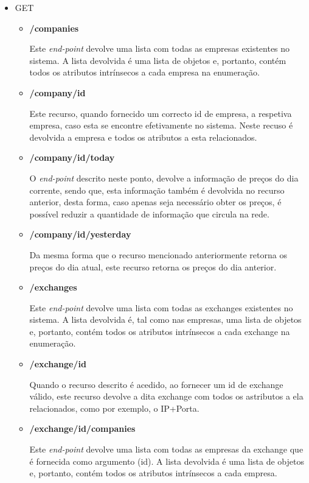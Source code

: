 \documentclass[a4paper,12pt]{article}
\begin{document}
\begin{itemize}
\item GET
  \begin{itemize}
    \item \textbf{/companies}
    \par Este \textit{end-point} devolve uma lista com todas as empresas existentes no sistema. A lista devolvida é uma lista de objetos e, portanto, contém todos os atributos intrínsecos a cada empresa na enumeração.
    
    \item \textbf{/company/{id}}
    \par Este recurso, quando fornecido um correcto id de empresa, a respetiva empresa, caso esta se encontre efetivamente no sistema. Neste recuso é devolvida a empresa e todos os atributos a esta relacionados.
    
    \item \textbf{/company/{id}/today}
    \par O \textit{end-point} descrito neste ponto, devolve a informação de preços do dia corrente, sendo que, esta informação também é devolvida no recurso anterior, desta forma, caso apenas seja necessário obter os preços, é possível reduzir a quantidade de informação que circula na rede.
    
    \item \textbf{/company/{id}/yesterday}
    \par Da mesma forma que o recurso mencionado anteriormente retorna os preços do dia atual, este recurso retorna os preços do dia anterior.
    
    \item \textbf{/exchanges}
    \par Este \textit{end-point} devolve uma lista com todas as exchanges existentes no sistema. A lista devolvida é, tal como nas empresas, uma lista de objetos e, portanto, contém todos os atributos intrínsecos a cada exchange na enumeração.

    \item \textbf{/exchange/{id}}
    \par Quando o recurso descrito é acedido, ao fornecer um id de exchange válido, este recurso devolve a dita exchange com todos os astributos a ela relacionados, como por exemplo, o IP+Porta.

    \item \textbf{/exchange/{id}/companies}
    \par Este \textit{end-point} devolve uma lista com todas as empresas da exchange que é fornecida como argumento (id). A lista devolvida é uma lista de objetos e, portanto, contém todos os atributos intrínsecos a cada empresa.
    

\end{itemize}
\end{itemize}
\end{document}
